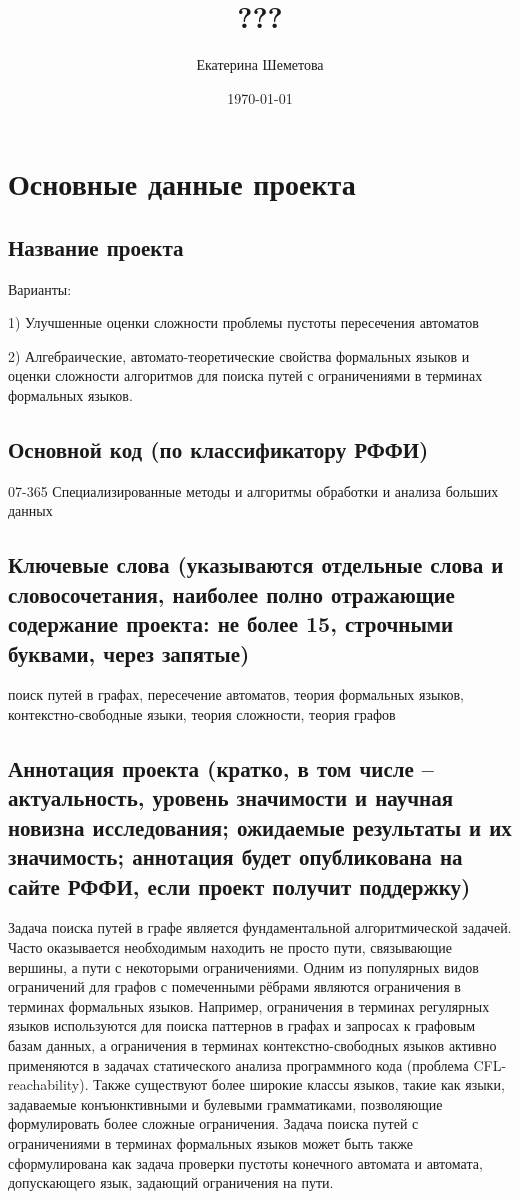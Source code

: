 \documentclass[12pt]{article}  %
\title{ ???}
\author{Екатерина Шеметова}
\date{\today}
\theoremstyle{remark}
\begin{document}

\maketitle

\section{Основные данные проекта}

\subsection{Название проекта}
Варианты:

1) Улучшенные оценки сложности проблемы пустоты пересечения автоматов 

2) Алгебраические, автомато-теоретические свойства формальных языков и оценки сложности алгоритмов для поиска путей с ограничениями в терминах формальных языков.


\subsection{Основной код (по классификатору РФФИ)}
07-365 Специализированные методы и алгоритмы обработки и анализа больших данных

\subsection{Ключевые слова (указываются отдельные слова и словосочетания, наиболее полно отражающие содержание проекта: не более 15, строчными буквами, через запятые)}
поиск путей в графах, пересечение автоматов, теория формальных языков, контекстно-свободные языки, теория сложности, теория графов

\subsection{Аннотация проекта (кратко, в том числе – актуальность, уровень значимости и научная новизна исследования; ожидаемые результаты и их значимость; аннотация будет опубликована на сайте РФФИ, если проект получит поддержку)}

Задача поиска путей в графе является фундаментальной алгоритмической задачей. Часто оказывается необходимым находить не просто пути, связывающие вершины, а пути с некоторыми ограничениями. Одним из популярных видов ограничений для графов с помеченными рёбрами являются ограничения в терминах формальных языков. Например, ограничения в терминах регулярных языков используются для поиска паттернов в графах и запросах к графовым базам данных, а ограничения в терминах контекстно-свободных языков активно применяются в задачах статического анализа программного кода (проблема CFL-reachability). Также существуют более широкие классы языков, такие как языки, задаваемые конъюнктивными и булевыми грамматиками, позволяющие формулировать более сложные ограничения. Задача поиска путей с ограничениями в терминах формальных языков может быть также сформулирована как задача проверки пустоты конечного автомата и автомата, допускающего язык, задающий ограничения на пути.
\end{document}
